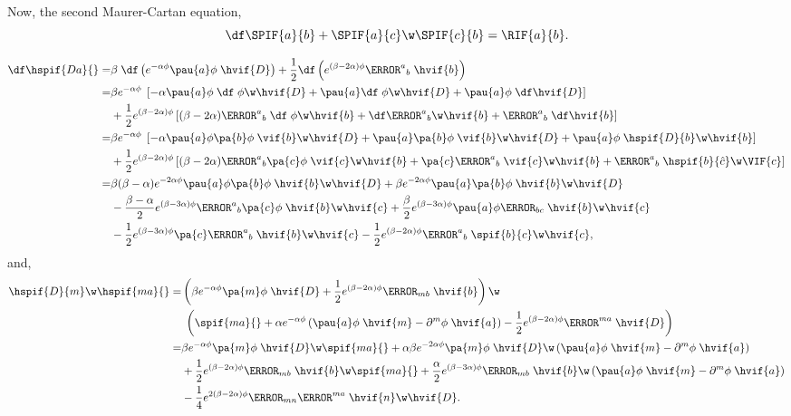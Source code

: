Now, the second Maurer-Cartan equation,
\begin{equation}
  \df\SPIF{a}{b}+\SPIF{a}{c}\w\SPIF{c}{b}=\RIF{a}{b}.
\end{equation}

\begin{align}
  \df\hspif{D a}{} 
  =& \beta\;\df\left( e^{-\alpha\phi}\pau{a}\phi\;\hvif{D}\right) + \frac{1}{2}\df\left(e^{(\beta-2\alpha)\phi}\F^a{}_{b}\;\hvif{b}\right)\nonumber\\
  =& \beta e^{-\alpha\phi}\;\left[-\alpha \pau{a}\phi\;\df\;\phi\w\hvif{D} +\pau{a}\df\;\phi\w\hvif{D} + \pau{a}\phi\;\df\hvif{D}\right]\notag\\
  & + \frac{1}{2}e^{(\beta-2\alpha)\phi}\left[(\beta-2\alpha)\F^a{}_{b}\;\df\;\phi\w\hvif{b} + \df \F^a{}_{b}\w\hvif{b} + \F^a{}_{b}\;\df\hvif{b}\right]\nonumber\\
  =& \beta e^{-\alpha\phi}\;\left[-\alpha \pau{a}\phi\pa{b}\phi\;\vif{b}\w\hvif{D} +\pau{a}\pa{b}\phi\;\vif{b}\w\hvif{D} + \pau{a}\phi\;\hspif{D}{b}\w\hvif{b}\right] \notag\\
  &+ \frac{1}{2}e^{(\beta-2\alpha)\phi}\left[(\beta-2\alpha)\F^a{}_b\pa{c}\phi\;\vif{c}\w\hvif{b} + \pa{c} \F^a{}_b\;\vif{c}\w\hvif{b} + \F^a{}_b\;\hspif{b}{\hat{c}}\w\VIF{c}\right]\nonumber\\
  =& \beta(\beta-\alpha)e^{-2\alpha\phi}\pau{a}\phi\pa{b}\phi\;\hvif{b}\w\hvif{D} + \beta e^{-2\alpha\phi}\pau{a}\pa{b}\phi\;\hvif{b}\w\hvif{D}  \notag\\
  &-\frac{\beta-\alpha}{2}e^{(\beta-3\alpha)\phi}\F^a{}_b\pa{c}\phi\;\hvif{b}\w\hvif{c} +\frac{\beta}{2}e^{(\beta-3\alpha)\phi}\pau{a}\phi \F_{bc}\;\hvif{b}\w\hvif{c}\nonumber\\
  & -\frac{1}{2}e^{(\beta-3\alpha)\phi}\pa{c} \F^a{}_b\;\hvif{b}\w\hvif{c} - \frac{1}{2}e^{(\beta-2\alpha)\phi}\F^a{}_b\; \spif{b}{c}\w\hvif{c},
\end{align}
and,
\begin{align}
  \hspif{D}{m}\w\hspif{m a}{} =& \left(\beta e^{-\alpha\phi}\pa{m}\phi\;\hvif{D} + \frac{1}{2}e^{(\beta-2\alpha)\phi}\F_{m b}\;\hvif{b}  \right)\w\notag\\
  &{}\;\left(\spif{m a}{} + \alpha e^{-\alpha\phi}\left(\pau{a}\phi\;\hvif{m} - \partial^{m}\phi\;\hvif{a}\right) - \frac{1}{2}e^{(\beta-2\alpha)\phi}\F^{m a}\;\hvif{D}  \right)\nonumber\\
  =& \beta e^{-\alpha\phi}\pa{m}\phi\;\hvif{D}\w\spif{m a}{} + \alpha\beta e^{-2\alpha\phi}\pa{m}\phi\;\hvif{D}\w\left(\pau{a}\phi\;\hvif{m} - \partial^{m}\phi\;\hvif{a}\right)\nonumber\\
  & + \frac{1}{2}e^{(\beta-2\alpha)\phi}\F_{m b}\;\hvif{b}\w\spif{m a}{} + \frac{\alpha}{2}e^{(\beta-3\alpha)\phi}\F_{m b}\;\hvif{b}\w\left(\pau{a}\phi\;\hvif{m} - \partial^{m}\phi\;\hvif{a}\right)\nonumber\\
  & -\frac{1}{4}e^{2(\beta-2\alpha)\phi}\F_{m n}\F^{m a}\;\hvif{n}\w\hvif{D}.
\end{align}

